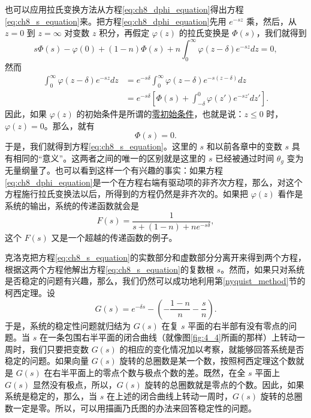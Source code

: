 也可以应用拉氏变换方法从方程\eqref{eq:ch8_dphi_equation}得出方程\eqref{eq:ch8_s_equation}来。把方程\eqref{eq:ch8_dphi_equation}先用 $e^{-sz}$ 乘，然后，从 $z = 0$ 到 $z = \infty$ 对变数 $z$ 积分，再假定 $\varphi(z)$ 的拉氏变换是 $\Phi(s)$，我们就得到
\begin{equation*}
s\Phi(s) - \varphi(0) + (1 - n)\Phi(s) + n\int_0^\infty \varphi(z - \delta)e^{-sz}dz = 0,
\end{equation*}
然而
\begin{equation*}
\begin{array}{ll}
\int_0^\infty \varphi(z - \delta)e^{-sz}dz 
&= e^{-s\delta}\int_0^\infty \varphi(z - \delta)e^{-s(z-\delta)}dz\\
&= e^{-s\delta}\left[\Phi(s) + \int_{-\delta}^0 \varphi(z')e^{-sz'}dz'\right].
\end{array}
\end{equation*}
因此，如果 $\varphi(z)$ 的初始条件是所谓的\underline{零初始条件}，也就是说：$z \leq 0$ 时，$\varphi(z) = 0$。那么，就有
\begin{equation*}
[s + (1 - n) + n e^{-s\delta}]\Phi(s) = 0.
\end{equation*}
于是，我们就得到方程\eqref{eq:ch8_s_equation}。这里的 $s$ 和以前各章中的变数 $s$ 具有相同的“意义”。这两者之间的唯一的区别就是这里的 $s$ 已经被通过时间 $\theta_g$ 变为无量纲量了。也可以看到这样一个有兴趣的事实：如果方程\eqref{eq:ch8_dphi_equation}是一个在方程右端有驱动项的非齐次方程，那么，对这个方程施行拉氏变换法以后，所得到的方程仍然是非齐次的。如果把 $\varphi(z)$ 看作是系统的输出，系统的传递函数就会是
\begin{equation*}
F(s) = \frac{1}{s + (1 - n) + ne^{-s\delta}},
\end{equation*}
这个 $F(s)$ 又是一个超越的传递函数的例子。

克洛克把方程\eqref{eq:ch8_s_equation}的实数部分和虚数部分分离开来得到两个方程，根据这两个方程他解出方程\eqref{eq:ch8_s_equation}的复数根 $s$。然而，如果只对系统是否稳定的问题有兴趣，那么，我们仍然可以成功地利用第\ref{nyquist_method}节的柯西定理。设
\begin{equation}\label{eq:ch8_Gs_definition}
G(s) = e^{-\delta s} - \left( -\frac{1 - n}{n} - \frac{s}{n} \right).
\end{equation}
于是，系统的稳定性问题就归结为 $G(s)$ 在复 $s$ 平面的右半部有没有零点的问题。当 $s$ 在一条包围右半平面的闭合曲线（就像图\ref{fig:4_4}所画的那样）上转动一周时，我们只要把变数 $G(s)$ 的相应的变化情况加以考察，就能够回答系统是否稳定的问题。如果向量 $G(s)$ 旋转的总圈数是某一个数，按照柯西定理这个数就是 $G(s)$ 在右半平面上的零点个数与极点个数的差。既然，在全 $s$ 平面上 $G(s)$ 显然没有极点，所以，$G(s)$ 旋转的总圈数就是零点的个数。因此，如果系统是稳定的，那么，当 $s$ 在上述的闭合曲线上转动一周时，$G(s)$ 旋转的总圈数一定是零。所以，可以用描画乃氏图的办法来回答稳定性的问题。

